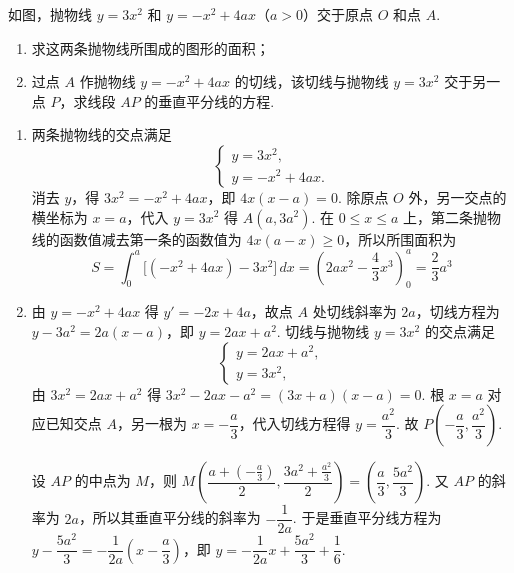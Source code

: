 \documentclass[UTF8,a4paper,oneside,11pt]{ctexbook}
\begin{document}
\begin{problem}
如图，抛物线 \(y = 3x^{2}\) 和 \(y = -x^{2} + 4ax\)（\(a > 0\)）交于原点 \(O\) 和点 \(A\).

\begin{enumerate}
\item 求这两条抛物线所围成的图形的面积；
\item 过点 \(A\) 作抛物线 \(y = -x^{2} + 4ax\) 的切线，该切线与抛物线 \(y = 3x^{2}\) 交于另一点 \(P\)，求线段 \(AP\) 的垂直平分线的方程.
\end{enumerate}

\end{problem}

\begin{solution}
\begin{enumerate}
\item 两条抛物线的交点满足
\[
\begin{cases}
y = 3x^2,\\
y = -x^2 + 4ax.
\end{cases}
\]
消去 \(y\)，得 \(3x^2=-x^2+4ax\)，即 \(4x(x-a)=0\). 除原点 \(O\) 外，另一交点的横坐标为 \(x=a\)，代入 \(y=3x^2\) 得 \(A(a,3a^2)\). 在 \(0\leq x\leq a\) 上，第二条抛物线的函数值减去第一条的函数值为 \(4x(a-x)\geq0\)，所以所围面积为
\[
S=\int_0^a\bigl[(-x^2+4ax)-3x^2\bigr]\,dx=\left(2ax^2-\frac43x^3\right)_0^a=\frac23a^3
\]

\item 由 \(y = -x^2 + 4ax\) 得 \(y' = -2x + 4a\)，故点 \(A\) 处切线斜率为 \(2a\)，切线方程为 \(y - 3a^2 = 2a(x - a)\)，即 \(y = 2ax + a^2\).
切线与抛物线 \(y=3x^2\) 的交点满足
\[
\begin{cases}
y = 2ax + a^2,\\
y = 3x^2,
\end{cases}
\]
由 \(3x^2=2ax+a^2\) 得 \(3x^2-2ax-a^2=(3x+a)(x-a)=0\). 根 \(x=a\) 对应已知交点 \(A\)，另一根为 \(x=-\dfrac{a}{3}\)，代入切线方程得 \(y=\dfrac{a^2}{3}\). 故 \(P\left(-\dfrac{a}{3},\dfrac{a^2}{3}\right)\).

设 \(AP\) 的中点为 \(M\)，则
\(M\left(\dfrac{a+(-\frac{a}{3})}2,\dfrac{3a^2+\frac{a^2}{3}}2\right)=\left(\dfrac a3,\dfrac{5a^2}{3}\right)\). 又 \(AP\) 的斜率为 \(2a\)，所以其垂直平分线的斜率为 \(-\dfrac1{2a}\). 于是垂直平分线方程为
\(y-\dfrac{5a^2}{3}=-\dfrac1{2a}\left(x-\dfrac a3\right)\)，即 \(y=-\dfrac1{2a}x+\dfrac{5a^2}{3}+\dfrac16\).
\end{enumerate}
\end{solution}
\end{document}
